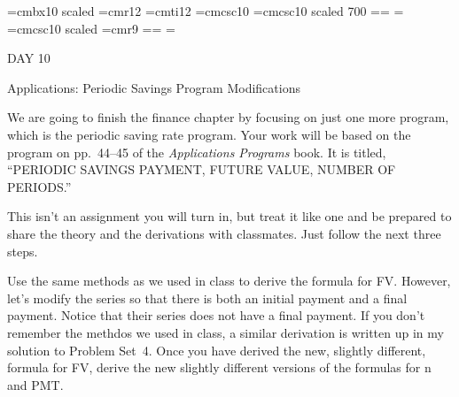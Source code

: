 
\def\folio{\ifnum\pageno>0 \number\pageno \else
   \ifnum\pageno<0 \romannumeral-\pageno \else\fi\fi}

\font\largebf=cmbx10  scaled 
\font\largerm=cmr12
\font\largeit=cmti12
\font\tensc=cmcsc10
\font\sevensc=cmcsc10 scaled 700
\newfam\scfam \def\sc{\fam\scfam\tensc}
\textfont\scfam=\tensc \scriptfont\scfam=\sevensc
\scriptscriptfont\scfam=\sevensc
\font\largesc=cmcsc10 scaled 
\font\ninerm=cmr9
\newfam\srfam \def\sr{\fam\srfam\ninerm}
\textfont\srfam=\ninerm \scriptfont\srfam=\sevenrm
\scriptscriptfont\srfam=\fiverm




\null\vskip36pt

\centerline{\largerm DAY 10}
\nobreak\bigskip

\centerline{\largeit Applications: Periodic Savings Program Modifications}
\nobreak\bigskip

\nobreak\bigskip

\noindent  We are going to finish the finance chapter by focusing on just one more program, which is the periodic saving rate program. Your work will be based on the program on pp.~44--45 of the {\it Applications Programs} book. It is titled, ``PERIODIC SAVINGS
PAYMENT, FUTURE VALUE, NUMBER OF PERIODS.''
\bigskip

\nobreak\bigskip

\noindent This isn't an assignment you will turn in, but treat it like one and be prepared to share the theory and the derivations with classmates. Just follow the next three steps.
\bigskip


\bigskip

\noindent Use the same methods as we used in class to derive the formula for FV. However, let's modify the series so that there is both an initial payment and a final payment. Notice that their series does not have a final payment. If you don't remember the methdos we used in class, a similar derivation is written up in my solution to Problem Set~4. Once you have derived the new, slightly different, formula for FV, derive the new slightly different versions of the formulas for n and PMT.

\bigskip

\nobreak\bigskip

